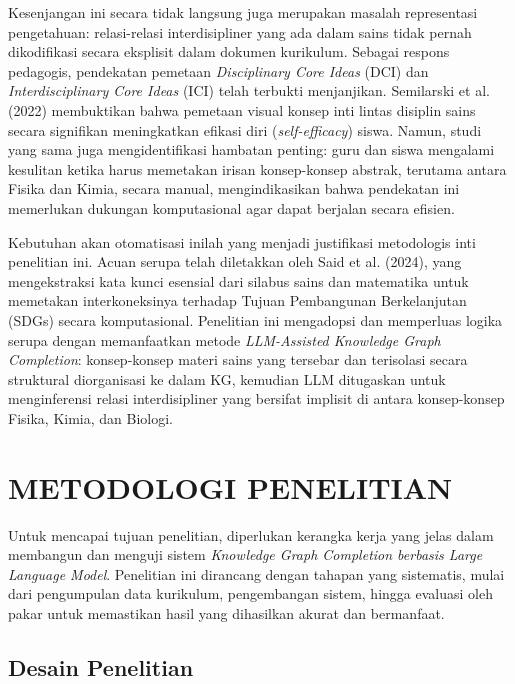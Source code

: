 \documentclass[
]{article}
\begin{document}
Kesenjangan ini secara tidak langsung juga merupakan masalah
representasi pengetahuan: relasi-relasi interdisipliner yang ada dalam
sains tidak pernah dikodifikasi secara eksplisit dalam dokumen
kurikulum. Sebagai respons pedagogis, pendekatan pemetaan
\emph{Disciplinary Core Ideas} (DCI) dan \emph{Interdisciplinary Core
Ideas} (ICI) telah terbukti menjanjikan. Semilarski et al. (2022)
membuktikan bahwa pemetaan visual konsep inti lintas disiplin sains
secara signifikan meningkatkan efikasi diri (\emph{self-efficacy})
siswa. Namun, studi yang sama juga mengidentifikasi hambatan penting:
guru dan siswa mengalami kesulitan ketika harus memetakan irisan
konsep-konsep abstrak, terutama antara Fisika dan Kimia, secara manual,
mengindikasikan bahwa pendekatan ini memerlukan dukungan komputasional
agar dapat berjalan secara efisien.

Kebutuhan akan otomatisasi inilah yang menjadi justifikasi metodologis
inti penelitian ini. Acuan serupa telah diletakkan oleh Said et al.
(2024), yang mengekstraksi kata kunci esensial dari silabus sains dan
matematika untuk memetakan interkoneksinya terhadap Tujuan Pembangunan
Berkelanjutan (SDGs) secara komputasional. Penelitian ini mengadopsi dan
memperluas logika serupa dengan memanfaatkan metode \emph{LLM-Assisted
Knowledge Graph Completion}: konsep-konsep materi sains yang tersebar
dan terisolasi secara struktural diorganisasi ke dalam KG, kemudian LLM
ditugaskan untuk menginferensi relasi interdisipliner yang bersifat
implisit di antara konsep-konsep Fisika, Kimia, dan Biologi.

\hypertarget{metodologi-penelitian}{%
\section{\texorpdfstring{\hfill\break
METODOLOGI
PENELITIAN}{ METODOLOGI PENELITIAN}}\label{metodologi-penelitian}}

Untuk mencapai tujuan penelitian, diperlukan kerangka kerja yang jelas
dalam membangun dan menguji sistem \emph{Knowledge Graph Completion
berbasis Large Language Model}. Penelitian ini dirancang dengan tahapan
yang sistematis, mulai dari pengumpulan data kurikulum, pengembangan
sistem, hingga evaluasi oleh pakar untuk memastikan hasil yang
dihasilkan akurat dan bermanfaat.

\hypertarget{desain-penelitian}{%
\subsection{Desain Penelitian}\label{desain-penelitian}}
\end{document}
